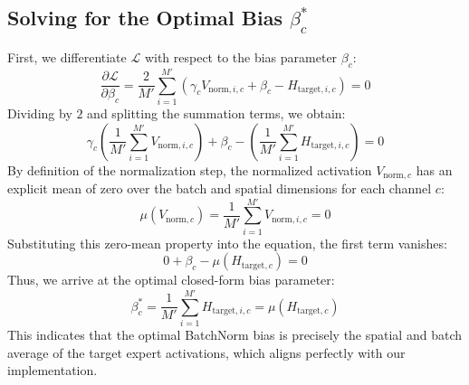 \documentclass{article}
\theoremstyle{plain}
\theoremstyle{definition}
\theoremstyle{remark}
\begin{document}
\subsection{Solving for the Optimal Bias $\beta_c^*$}
First, we differentiate $\mathcal{L}$ with respect to the bias parameter $\beta_c$:
\begin{equation}
    \frac{\partial \mathcal{L}}{\partial \beta_c} = \frac{2}{M'} \sum_{i=1}^{M'} \left( \gamma_c V_{\text{norm}, i, c} + \beta_c - H_{\text{target}, i, c} \right) = 0
\end{equation}
Dividing by $2$ and splitting the summation terms, we obtain:
\begin{equation}
    \gamma_c \left( \frac{1}{M'} \sum_{i=1}^{M'} V_{\text{norm}, i, c} \right) + \beta_c - \left( \frac{1}{M'} \sum_{i=1}^{M'} H_{\text{target}, i, c} \right) = 0
\end{equation}
By definition of the normalization step, the normalized activation $V_{\text{norm}, c}$ has an explicit mean of zero over the batch and spatial dimensions for each channel $c$:
\begin{equation}
    \mu(V_{\text{norm}, c}) = \frac{1}{M'} \sum_{i=1}^{M'} V_{\text{norm}, i, c} = 0
\end{equation}
Substituting this zero-mean property into the equation, the first term vanishes:
\begin{equation}
    0 + \beta_c - \mu(H_{\text{target}, c}) = 0
\end{equation}
Thus, we arrive at the optimal closed-form bias parameter:
\begin{equation}
    \beta_c^* = \frac{1}{M'} \sum_{i=1}^{M'} H_{\text{target}, i, c} = \mu(H_{\text{target}, c})
\end{equation}
This indicates that the optimal BatchNorm bias is precisely the spatial and batch average of the target expert activations, which aligns perfectly with our implementation.
\end{document}
